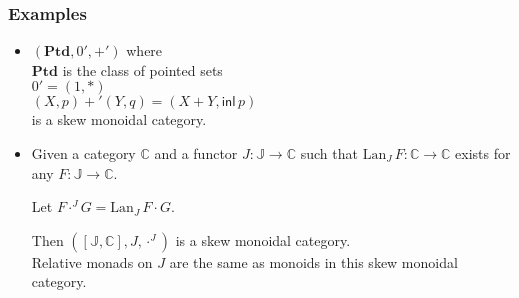 \documentclass[10pt,t]{beamer}
\newcommand{\I}{\mathsf{I}}
\newcommand{\ot}{\otimes}
\newcommand{\C}{\mathbb{C}}
\newcommand{\J}{\mathbb{J}}
\newcommand{\e}{\mathsf{e}}
\newcommand{\m}{\mathsf{m}}
\newcommand{\Lan}{\mathrm{Lan}}
\begin{document}
\begin{frame}

\frametitle{Examples}

\begin{itemize}

\item $(\mathbf{Ptd}, 0', +')$ where \\
$\mathbf{Ptd}$ is the class of pointed sets \\
$0' = (1, \ast)$ \\
$(X, p) +' (Y, q) = (X + Y, \mathsf{inl}\, p)$ \\
is a skew monoidal category.

\bigskip

\item Given a category $\C$ and a functor $J : \J \to \C$
  such that $\Lan_J\, F : \C \to \C$ exists for any $F : \J \to \C$.

  Let $F \cdot^J G = \Lan_J\, F \cdot G$. 

  Then $([\J,\C], J, \cdot^J)$ is a skew monoidal category. \\[6pt]

  Relative monads on $J$ are the same as monoids in this skew monoidal
  category.


\end{itemize}

\end{frame}











\end{document}
